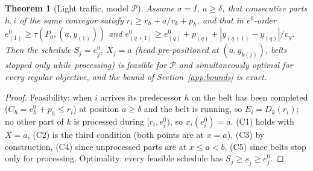 \documentclass[11pt,a4paper]{article}
\theoremstyle{plain}
\newtheorem{theorem}{Theorem}
\theoremstyle{definition}
\theoremstyle{remark}
\newcommand{\Pb}{\mathcal{P}}
\begin{document}
\begin{theorem}[Light traffic, model $\Pb$]\label{thm:LTP}
Assume $\sigma=I$, $a\ge\delta$, that consecutive parts $h,i$ of the same conveyor satisfy
$r_i\ge r_h+a/v_k+p_h$, and that in $e^0$-order $e^0_{(1)}\ge\tau(P_0,(a,y_{(1)}))$ and
$e^0_{(q+1)}\ge e^0_{(q)}+p_{(q)}+|y_{(q+1)}-y_{(q)}|/v_y$. Then the schedule $S_j=e^0_j$,
$X_j=a$ (head pre-positioned at $(a,y_{k(j)})$, belts stopped only while processing) is
feasible for $\Pb$ and simultaneously optimal for every regular objective, and the bound
of Section~\ref{app:bounds} is exact.
\end{theorem}
\begin{proof}
Feasibility: when $i$ arrives its predecessor $h$ on the belt has been completed
($C_h=e^0_h+p_h\le r_i$) at position $a\ge\delta$ and the belt is running, so
$E_i=D_k(r_i)$; no other part of $k$ is processed during $[r_i,e^0_i)$, so $x_i(e^0_i)=a$.
(C1) holds with $X=a$, (C2) is the third condition (both points are at $x=a$), (C3) by
construction, (C4) since unprocessed parts are at $x\le a<b$, (C5) since belts stop only
for processing. Optimality: every feasible schedule has $S_j\ge\underline s_j\ge e^0_j$.
\end{proof}
\end{document}
